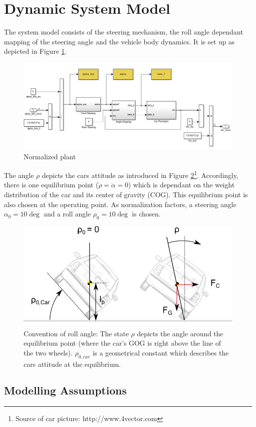 \documentclass[conference]{IEEEtran}
\begin{document}
\section{Dynamic System Model}

The system model consists of the steering mechanism, the roll angle dependant mapping of the steering angle and the vehicle body dynamics. It is set up as depicted in Figure \ref{figure:P_car}. 

\begin{figure}[h]
\centering
  \includegraphics[width=.47\textwidth]{pics/P_car.png} 
  \caption{Normalized plant}  
  \label{figure:P_car}
\end{figure}

The angle $\rho$ depicts the cars attitude as introduced in Figure \ref{figure:car_from_back}\footnote{Source of car picture: http://www.4vector.com}. Accordingly, there is one equilibrium point ($\dot{\rho} = \dot{\alpha} = 0$) which is dependant on the weight distribution of the car and its center of gravity (COG). This equilibrium point is also chosen at the operating point. As normalization factors, a steering angle $\alpha_{0}=10\deg$ and a roll angle $\rho_{0}=10\deg$ is chosen.

\begin{figure}[h]
\centering
  \includegraphics[width=.47\textwidth]{pics/car_from_back} 
  \caption{Convention of roll angle: The state $\rho$ depicts the angle around the equilibrium point (where the car's GOG is right above the line of the two wheels). $\rho_{0,car}$ is a geometrical constant which describes the cars attitude at the equilibrium.}  
  \label{figure:car_from_back}
\end{figure}



\subsection{Modelling Assumptions}
\end{document}

